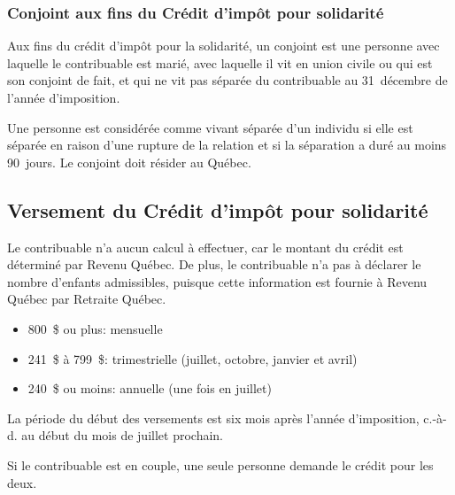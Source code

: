 \subsubsection{Conjoint aux fins du Crédit d'impôt pour solidarité}
Aux fins du crédit d'impôt pour la solidarité, un \og conjoint \fg{} est une personne avec laquelle le contribuable est marié, avec laquelle il vit en union civile ou qui est son conjoint de fait, et qui ne vit pas séparée du contribuable au 31~décembre de l'année d'imposition.

Une personne est considérée comme vivant séparée d'un individu si elle est séparée en raison d'une rupture de la relation et si la séparation a duré au moins 90~jours. Le conjoint doit résider au Québec.


\subsection{Versement du Crédit d'impôt pour solidarité}
Le contribuable n'a aucun calcul à effectuer, car le montant du crédit est déterminé par Revenu Québec. De plus, le contribuable n'a pas à déclarer le nombre d'enfants admissibles, puisque cette information est fournie à Revenu Québec par Retraite Québec.
\begin{itemize}
	\item 800~\$ ou plus: mensuelle 
	\item 241~\$ à 799~\$: trimestrielle (juillet, octobre, janvier et avril)
	\item 240~\$ ou moins: annuelle (une fois en juillet)
\end{itemize}

La période du début des versements est six mois après l'année d'imposition, c.-à-d. au début du mois de juillet prochain.

Si le contribuable est en couple, une seule personne demande le crédit pour les deux.

